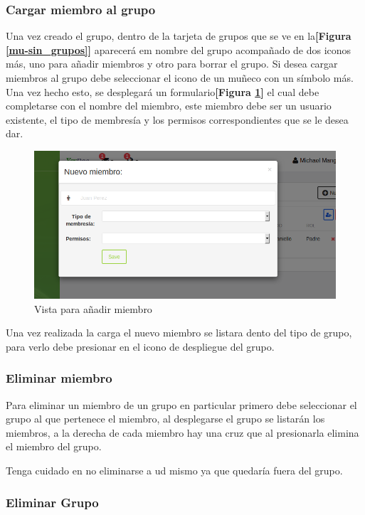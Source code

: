 \subsubsection{Cargar miembro al grupo}

Una vez creado el grupo, dentro de la tarjeta de grupos que se ve en la\textbf{[Figura \ref{mu-sin_grupos}]} aparecerá em nombre del grupo acompañado de dos iconos más, uno para añadir miembros y otro para borrar el grupo. Si desea cargar miembros al grupo debe seleccionar el icono de un muñeco con un símbolo más. Una vez hecho esto, se desplegará un formulario\textbf{[Figura \ref{mu-anadir_miembro}]} el cual debe completarse con el nombre del miembro, este miembro debe ser un usuario existente, el tipo de membresía y los permisos correspondientes que se le desea dar.
    \begin{figure}
    	\centering
    	\includegraphics[width=.8\textwidth]{img/manual_de_usuario/aniadir_miembro}
    	\caption{Vista para añadir miembro}
    	\label{mu-anadir_miembro}
    \end{figure}
Una vez realizada la carga el nuevo miembro se listara dento del tipo de grupo, para verlo debe presionar en el icono de despliegue del grupo.

\subsubsection{Eliminar miembro}
Para eliminar un miembro de un grupo en particular primero debe seleccionar el grupo al que pertenece el miembro, al desplegarse el grupo se listarán los miembros, a la derecha de cada miembro hay una cruz que al presionarla elimina el miembro del grupo.

Tenga cuidado en no eliminarse a ud mismo ya que quedaría fuera del grupo.

\subsubsection{Eliminar Grupo}

